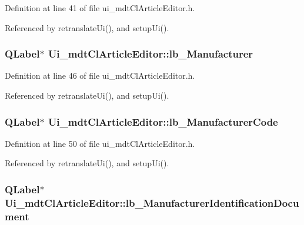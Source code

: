 Definition at line 41 of file ui\-\_\-mdt\-Cl\-Article\-Editor.\-h.



Referenced by retranslate\-Ui(), and setup\-Ui().

\hypertarget{class_ui__mdt_cl_article_editor_a2c5601307a68a638f76742b9e8e84d65}{
\subsubsection[{lb\-\_\-\-Manufacturer}]{\setlength{\rightskip}{0pt plus 5cm}Q\-Label$\ast$ Ui\-\_\-mdt\-Cl\-Article\-Editor\-::lb\-\_\-\-Manufacturer}}\label{class_ui__mdt_cl_article_editor_a2c5601307a68a638f76742b9e8e84d65}


Definition at line 46 of file ui\-\_\-mdt\-Cl\-Article\-Editor.\-h.



Referenced by retranslate\-Ui(), and setup\-Ui().

\hypertarget{class_ui__mdt_cl_article_editor_aee4c86d3633977d067a9c9ae32f09386}{
\subsubsection[{lb\-\_\-\-Manufacturer\-Code}]{\setlength{\rightskip}{0pt plus 5cm}Q\-Label$\ast$ Ui\-\_\-mdt\-Cl\-Article\-Editor\-::lb\-\_\-\-Manufacturer\-Code}}\label{class_ui__mdt_cl_article_editor_aee4c86d3633977d067a9c9ae32f09386}


Definition at line 50 of file ui\-\_\-mdt\-Cl\-Article\-Editor.\-h.



Referenced by retranslate\-Ui(), and setup\-Ui().

\hypertarget{class_ui__mdt_cl_article_editor_ab4614dfa23e032d737d987ebb2ae109c}{
\subsubsection[{lb\-\_\-\-Manufacturer\-Identification\-Document}]{\setlength{\rightskip}{0pt plus 5cm}Q\-Label$\ast$ Ui\-\_\-mdt\-Cl\-Article\-Editor\-::lb\-\_\-\-Manufacturer\-Identification\-Document}}\label{class_ui__mdt_cl_article_editor_ab4614dfa23e032d737d987ebb2ae109c}



